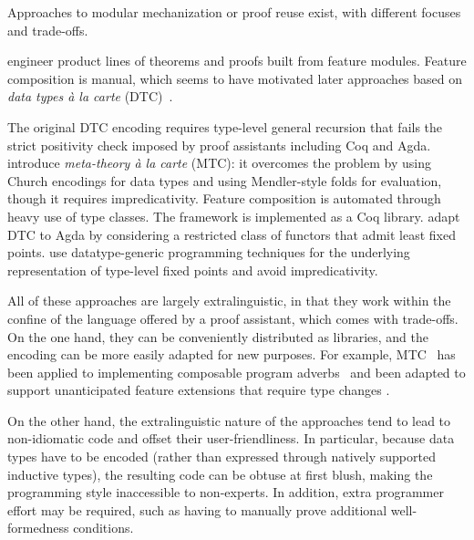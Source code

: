 Approaches to modular mechanization or proof reuse exist,
with different focuses and trade-offs.


\citet{delaware2011} engineer product lines of theorems and proofs built
from feature modules. Feature composition is manual, which seems to have
motivated later approaches based on \emph{data types à la carte} (DTC)~\cite{dtc}.

The original DTC encoding requires type-level general recursion that
fails the strict positivity check imposed by proof assistants including Coq and Agda.
\citet{delaware2013} introduce \emph{meta-theory à la carte} (MTC):
it overcomes the problem by using Church encodings for
data types and using Mendler-style folds for evaluation,
though it requires  impredicativity.
Feature composition is automated through heavy use of type classes.
The framework is implemented as a Coq library.
\citet{schwaab2013modular} adapt DTC to Agda by considering a restricted
class of functors that admit least fixed points.
\citet{keuchel2013generic} use datatype-generic programming techniques
for the underlying representation of type-level fixed points and
avoid  impredicativity.

All of these approaches are largely extra\-linguistic, in that they work
within the confine of the language offered by a proof assistant, which
comes with trade-offs.
On the one hand,
they can be conveniently distributed as libraries, and the encoding can
be more easily adapted for new purposes.
For example, MTC~\cite{delaware2013} has been applied to implementing
composable program adverbs~\cite{liwei2022} and been adapted to support
unanticipated feature extensions that require type changes
\cite{delaware2013b}.

On the other hand, the extra\-linguistic nature of the approaches tend
to lead to non-idiomatic code and offset their user-friendliness.
In particular, because data types have to be encoded (rather than expressed
through natively supported inductive types), the resulting code can be
obtuse at first blush, making the programming style inaccessible to non-experts.
In addition, extra programmer effort may be required, such as
having to manually prove additional well-formedness conditions. %

